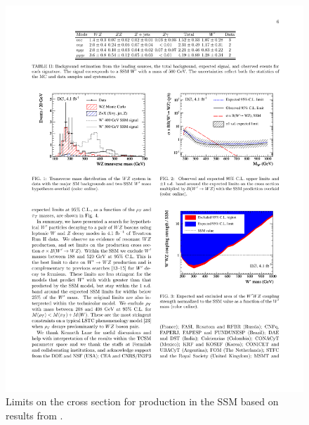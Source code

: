 \begin{figure}
  \centering
  \includegraphics{figures/d0limit-wprime}
  \caption[\wprime limits from \dzero]{Limits on the cross section for \wprime production in the SSM based on results from \dzero{}.}
  \label{fig:d0limit-wprime}
\end{figure}

